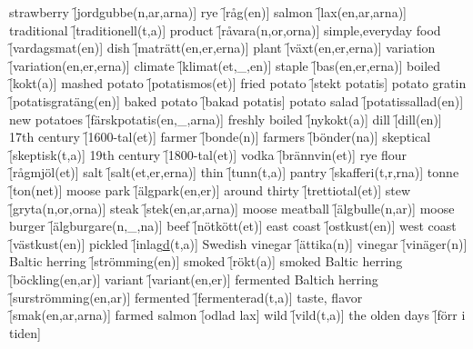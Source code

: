 \begin{questions}
    \begin{multicols}{2}
        \raggedcolumns
        \question strawberry \f[jordgubbe(n,ar,arna)]
        \question rye \f[råg(en)]
        \question salmon \f[lax(en,ar,arna)]
        \question traditional \f[traditionell(t,a)]
        \question product \f[råvara(n,or,orna)]
        \question simple,everyday food \f[vardagsmat(en)]
        \question dish \f[maträtt(en,er,erna)]
        \question plant \f[växt(en,er,erna)]
        \question variation \f[variation(en,er,erna)]
        \question climate \f[klimat(et,\_,en)]
        \question staple \f[bas(en,er,erna)]
        \question boiled \f[kokt(a)]
        \question mashed potato \f[potatismos(et)]
        \question fried potato \f[stekt potatis]
        \question potato gratin \f[potatisgratäng(en)]
        \question baked potato \f[bakad potatis]
        \question potato salad \f[potatissallad(en)]
        \question new potatoes \f[färskpotatis(en,\_,arna)]
        \question freshly boiled \f[nykokt(a)]
        \question dill \f[dill(en)]
        \question 17th century \f[1600-tal(et)]
        \question farmer \f[bonde(n)]
        \question farmers \f[bönder(na)]
        \question skeptical \f[skeptisk(t,a)]
        \question 19th century \f[1800-tal(et)]
        \question vodka \f[brännvin(et)]
        \question rye flour \f[rågmjöl(et)]
        \question salt \f[salt(et,er,erna)]
        \question thin \f[tunn(t,a)]
        \question pantry \f[skafferi(t,r,rna)]
        \question tonne \f[ton(net)]
        \question moose park \f[älgpark(en,er)]
        \question around thirty \f[trettiotal(et)]
        \question stew \f[gryta(n,or,orna)]
        \question steak \f[stek(en,ar,arna)]
        \question moose meatball \f[älgbulle(n,ar)]
        \question moose burger \f[älgburgare(n,\_,na)]
        \question beef \f[nötkött(et)]
        \question east coast \f[ostkust(en)]
        \question west coast \f[västkust(en)]
        \question pickled \f[inlag\underline{d}(t,a)]
        \question Swedish vinegar \f[ättika(n)]
        \question vinegar \f[vinäger(n)]
        \question Baltic herring \f[strömming(en)]
        \question smoked \f[rökt(a)]
        \question smoked Baltic herring \f[böckling(en,ar)]
        \question variant \f[variant(en,er)]
        \question fermented Baltich herring \f[surströmming(en,ar)]
        \question fermented \f[fermenterad(t,a)]
        \question taste, flavor \f[smak(en,ar,arna)]
        \question farmed salmon \f[odlad lax]
        \question wild \f[vild(t,a)]
        \question the olden days \f[förr i tiden]

\end{multicols}
\end{questions}
